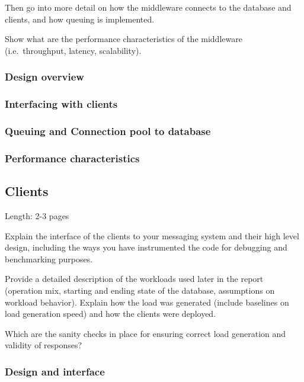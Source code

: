 \documentclass[11pt]{article}
\begin{document}
Then go into more detail on how the middleware connects to the database
and clients, and how queuing is implemented.

Show what are the performance characteristics of the middleware
(i.e.~throughput, latency, scalability).

\subsubsection{Design overview}\label{sec:design-overview}

\subsubsection{Interfacing with clients}\label{sec:interfacing-with-clients}

\subsubsection{Queuing and Connection pool to database}\label{sec:queuing-and-co
nnection-pool-to-database}

\subsubsection{Performance characteristics}\label{sec:performance-characteristic
s-1}

\subsection{Clients}\label{sec:clients}

Length: 2-3 pages

Explain the interface of the clients to your messaging system and their
high level design, including the ways you have instrumented the code for
debugging and benchmarking purposes.

Provide a detailed description of the workloads used later in the report
(operation mix, starting and ending state of the database, assumptions
on workload behavior). Explain how the load was generated (include
baselines on load generation speed) and how the clients were deployed.

Which are the sanity checks in place for ensuring correct load
generation and validity of responses?

\subsubsection{Design and interface}\label{sec:design-and-interface}
\end{document}

